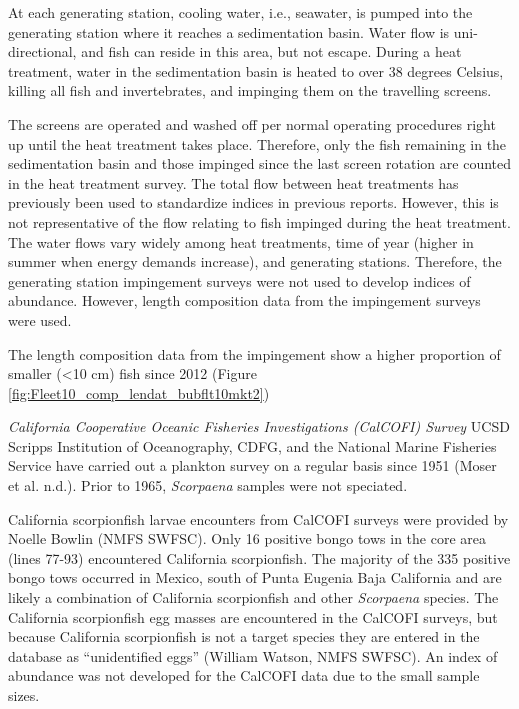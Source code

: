 \documentclass[12pt,]{article}
\begin{document}
At each generating station, cooling water, i.e., seawater, is pumped
into the generating station where it reaches a sedimentation basin.
Water flow is uni-directional, and fish can reside in this area, but not
escape. During a heat treatment, water in the sedimentation basin is
heated to over 38 degrees Celsius, killing all fish and invertebrates,
and impinging them on the travelling screens.

The screens are operated and washed off per normal operating procedures
right up until the heat treatment takes place. Therefore, only the fish
remaining in the sedimentation basin and those impinged since the last
screen rotation are counted in the heat treatment survey. The total flow
between heat treatments has previously been used to standardize indices
in previous reports. However, this is not representative of the flow
relating to fish impinged during the heat treatment. The water flows
vary widely among heat treatments, time of year (higher in summer when
energy demands increase), and generating stations. Therefore, the
generating station impingement surveys were not used to develop indices
of abundance. However, length composition data from the impingement
surveys were used.

The length composition data from the impingement show a higher
proportion of smaller (\textless{}10 cm) fish since 2012 (Figure
\ref{fig:Fleet10_comp_lendat_bubflt10mkt2})

\emph{California Cooperative Oceanic Fisheries Investigations (CalCOFI)
Survey} UCSD Scripps Institution of Oceanography, CDFG, and the National
Marine Fisheries Service have carried out a plankton survey on a regular
basis since 1951 (Moser et al. n.d.). Prior to 1965, \emph{Scorpaena}
samples were not speciated.

California scorpionfish larvae encounters from CalCOFI surveys were
provided by Noelle Bowlin (NMFS SWFSC). Only 16 positive bongo tows in
the core area (lines 77-93) encountered California scorpionfish. The
majority of the 335 positive bongo tows occurred in Mexico, south of
Punta Eugenia Baja California and are likely a combination of California
scorpionfish and other \emph{Scorpaena} species. The California
scorpionfish egg masses are encountered in the CalCOFI surveys, but
because California scorpionfish is not a target species they are entered
in the database as ``unidentified eggs'' (William Watson, NMFS SWFSC).
An index of abundance was not developed for the CalCOFI data due to the
small sample sizes.
\end{document}
